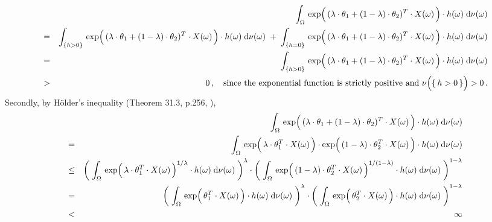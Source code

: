 \begin{eqnarray*}
&&
	\int_{\Omega}\,
		\exp\!\left(\,
			(\lambda\cdot\theta_{1}+(1-\lambda)\cdot\theta_{2})^{T}
			\!\overset{{\color{white}-}}{\cdot}\!
			X(\omega)
		\,\right)
		\cdot
	 	h(\omega)
	\;\d\nu(\omega)
\\
&=&
	\int_{\{h>0\}}\,
		\exp\!\left(\,
			(\lambda\cdot\theta_{1}+(1-\lambda)\cdot\theta_{2})^{T}
			\!\overset{{\color{white}-}}{\cdot}\!
			X(\omega)
		\,\right)
		\cdot
	 	h(\omega)
	\;\d\nu(\omega)
	\;+\;
	\int_{\{h=0\}}\,
		\exp\!\left(\,
			(\lambda\cdot\theta_{1}+(1-\lambda)\cdot\theta_{2})^{T}
			\!\overset{{\color{white}-}}{\cdot}\!
			X(\omega)
		\,\right)
		\cdot
	 	h(\omega)
	\;\d\nu(\omega)
\\
&=&
	\int_{\{h>0\}}\,
		\exp\!\left(\,
			(\lambda\cdot\theta_{1}+(1-\lambda)\cdot\theta_{2})^{T}
			\!\overset{{\color{white}-}}{\cdot}\!
			X(\omega)
		\,\right)
		\cdot
	 	h(\omega)
	\;\d\nu(\omega)
\\
&>& 0\,,
	\quad
	\textnormal{since the exponential function is strictly positive and
	$\nu\!\left(\{\,h \overset{{\color{white}.}}{>} 0\,\}\right) > 0$}\,.
\end{eqnarray*}
Secondly, by {\color{red}H\"older's inequality} (Theorem 31.3, p.256, \cite{Aliprantis1998}),
\begin{eqnarray*}
&&
	\int_{\Omega}\,
		\exp\!\left(\,
			(\lambda\cdot\theta_{1}+(1-\lambda)\cdot\theta_{2})^{T}
			\!\overset{{\color{white}-}}{\cdot}\!
			X(\omega)
		\,\right)
		\cdot
	 	h(\omega)
	\;\d\nu(\omega)
\\
&=&
	\int_{\Omega}\,
		\exp\!\left(\,
			\lambda\cdot\theta_{1}^{T}
			\!\overset{{\color{white}-}}{\cdot}\!
			X(\omega)
		\,\right)
		\cdot
		\exp\!\left(\,
			(1-\lambda)\cdot\theta_{2}^{T}
			\!\overset{{\color{white}-}}{\cdot}\!
			X(\omega)
		\,\right)
		\cdot
	 	h(\omega)
	\;\d\nu(\omega)
\\
&\leq&
	\left(\;
	\int_{\Omega}\,
		\exp\!\left(\,
			\lambda\cdot\theta_{1}^{T}
			\!\overset{{\color{white}-}}{\cdot}\!
			X(\omega)
		\,\right)^{1/\lambda}
		\cdot
	 	h(\omega)
	\;\d\nu(\omega)
	\;\right)^{\lambda}
	\cdot
	\left(\;
	\int_{\Omega}\,
		\exp\!\left(\,
			(1-\lambda)\cdot\theta_{2}^{T}
			\!\overset{{\color{white}-}}{\cdot}\!
			X(\omega)
		\,\right)^{1/(1-\lambda)}
		\cdot
	 	h(\omega)
	\;\d\nu(\omega)
	\;\right)^{1-\lambda}
\\
&=&
	\left(\;
	\int_{\Omega}\,
		\exp\!\left(\,
			\theta_{1}^{T} \!\overset{{\color{white}-}}{\cdot}\! X(\omega)
		\,\right)
		\cdot
	 	h(\omega)
	\;\d\nu(\omega)
	\;\right)^{\lambda}
	\cdot
	\left(\;
	\int_{\Omega}\,
		\exp\!\left(\,
			\theta_{2}^{T} \!\overset{{\color{white}-}}{\cdot}\! X(\omega)
		\,\right)
		\cdot
	 	h(\omega)
	\;\d\nu(\omega)
	\;\right)^{1-\lambda}
\\
&<& \infty
\end{eqnarray*}
